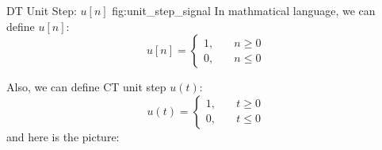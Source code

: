                         {DT Unit Step: $u[n]$}
                        {fig:unit_step_signal}
        In mathmatical language, we can define $u[n]$:
                \begin{equation}
                    u[n]=
                    \left\{
                        \begin{aligned}
                            1, \quad & n \geqslant 0 \\
                            0, \quad & n \leq 0
                        \end{aligned}
                    \right.
                \end{equation}

        Also, we can define CT unit step $u(t)$:
                \begin{equation}
                    u(t)=
                    \left\{
                        \begin{aligned}
                            1, \quad & t \geqslant 0 \\
                            0, \quad & t \leq 0
                        \end{aligned}
                    \right.
                \end{equation}
        \noindent and here is the picture:
                \inserttikzpicture
